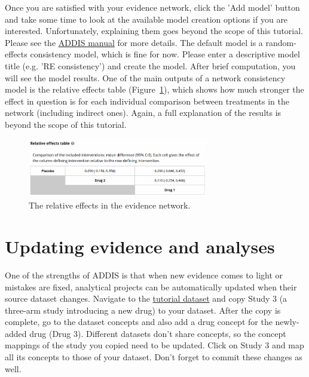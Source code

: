 \documentclass[12pt]{article}
\begin{document}
Once you are satisfied with your evidence network, click the 'Add model' button and take some time to look at the available model creation options if you are interested.
Unfortunately, explaining them goes beyond the scope of this tutorial.
Please see the \href{https://addis.drugis.org/manual.html#model-creation}{ADDIS manual} for more details.
The default model is a random-effects consistency model, which is fine for now.
Please enter a descriptive model title (e.g. 'RE consistency') and create the model.
After brief computation, you will see the model results.
One of the main outputs of a network consistency model is the relative effects table (Figure~\ref{fig:relativeEffects}), which shows how much stronger the effect in question is for each individual comparison between treatments in the network (including indirect ones).
Again, a full explanation of the results is beyond the scope of this tutorial.

\begin{figure}[!ht]
  \centering
  \includegraphics[width=0.7\textwidth]{img/relativeEffects.png}
  \caption{The relative effects in the evidence network.}
\label{fig:relativeEffects}
\end{figure}

\section{Updating evidence and analyses}

One of the strengths of ADDIS is that when new evidence comes to light or mistakes are fixed, analytical projects can be automatically updated when their source dataset changes.
Navigate to the \href{https://addis.drugis.org/#/users/12/datasets/c190e953-051c-4cf5-ac10-332984a14a43}{tutorial dataset} and copy Study 3 (a three-arm study introducing a new drug) to your dataset.
After the copy is complete, go to the dataset concepts and also add a drug concept for the newly-added drug (Drug 3).
Different datasets don't share concepts, so the concept mappings of the study you copied need to be updated.
Click on Study 3 and map all its concepts to those of your dataset.
Don't forget to commit these changes as well.
\end{document}
